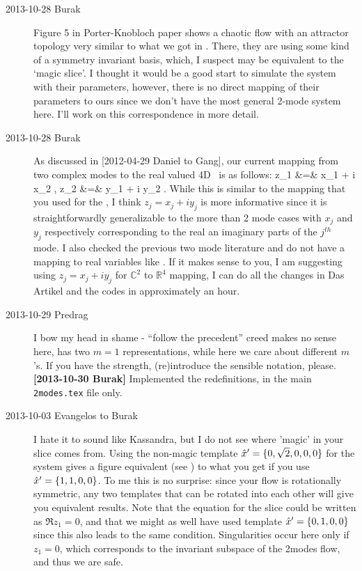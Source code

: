 \begin{description}
\item[2013-10-28 Burak] Figure 5 in Porter-Knobloch paper
shows a chaotic flow with an attractor topology very similar to what
we got in . There, they are using some kind of a
symmetry invariant basis, which, I suspect may be equivalent to the `magic slice'.
I thought it would be a good start to simulate the system with their parameters,
however, there is no direct mapping of their parameters to ours since we don't
have the most general 2-mode system here. I'll work on this correspondence in
more detail.

\item[2013-10-28 Burak] As discussed in [2012-04-29 Daniel to Gang], our current
mapping from two complex modes to the real valued 4D \statesp\ is as follows:
\bea
	z_1 &=& x_1 + i x_2 ,
	\continue
	z_2 &=& y_1 + i y_2 .
	\label{eq:C2toR4}
\eea
While this is similar to the mapping that you used for the {\cLe},
I think $z_j = x_j + i y_j$ is more informative since it is straightforwardly
generalizable to the more than 2 mode cases with $x_j$ and $y_j$  respectively
corresponding to the real an imaginary parts of the $j^{th}$ mode. I also
checked the previous two mode literature  and 
do not have a mapping to real variables like . If it makes
sense to you, I am suggesting using $z_j = x_j + i y_j$ for  $\mathbb{C}^2$
to $\mathbb{R}^4$ mapping, I can do all the changes in Das Artikel and the codes
in approximately an hour.

\item[2013-10-29 Predrag] I bow my head in shame - ``follow the
precedent'' creed makes no sense here, {\cLe} has two $m=1$
representations, while here we care about different $m$'s. If you
have the strength, (re)introduce the sensible notation, please.
\\
{\bf [2013-10-30 Burak]} Implemented the redefinitions, in the
main \texttt{2modes.tex} file only.



\item[2013-10-03 Evangelos to Burak]
I hate it to sound like Kassandra, but I do not see where 'magic' in
your slice comes from. Using the non-magic template
${\hat{x}'}=\{0,\sqrt{2},0,0,0\}$ for the {\twoMode} system gives a figure
equivalent (see ) to what you get if you
use ${\hat{x}'}=\{1,1,0,0\}$. To me this is no surprise: since your flow
is rotationally symmetric, any two templates that can be rotated into
each other will give you equivalent results. Note that the equation
for the slice could be written as $\Re z_1=0$, and that we might as
well have used template ${\hat{x}'}=\{0,1,0,0\}$ since this also leads
to the same condition. Singularities occur here only if $z_1=0$,
which corresponds to the invariant subspace of the 2modes flow, and
thus we are safe.


\end{description}

